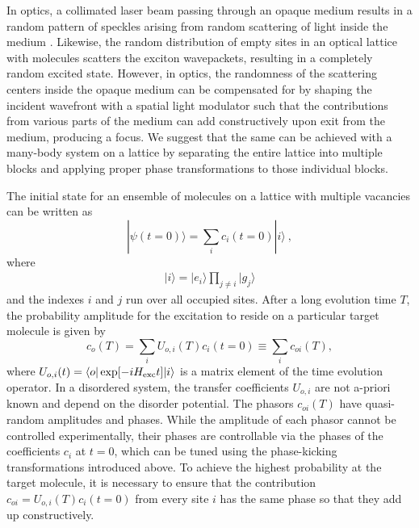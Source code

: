 In optics, a collimated laser beam passing through an opaque medium results in a random
pattern of speckles arising from random scattering of light inside the medium
\cite{RandomWave-books}. Likewise, the random distribution of empty sites in an optical lattice with molecules 
scatters the exciton wavepackets, resulting in a completely random excited state. 
However, in optics, the randomness of the scattering centers inside the opaque medium can be compensated for by
shaping the incident wavefront with a spatial light modulator such
that the contributions from various parts of the medium can add
constructively upon exit from the medium, producing a focus. 
We suggest that the same can be achieved with a many-body system on a lattice by 
separating the entire lattice into multiple blocks and applying proper phase transformations
to those individual blocks. 



%

The initial state for an ensemble of molecules on a lattice with multiple vacancies can be written as 
\begin{equation}
|\psi(t=0)\rangle = \sum_{i}c_i(t=0)|i\rangle \ , \label{planewave-initial}
\end{equation}
where 
\begin{eqnarray}
| i \rangle = |e_i\rangle \prod_{j\neq i} |g_j\rangle
\end{eqnarray}
and the indexes $i$ and $j$ run over all occupied sites. After a long evolution time $T$, the probability amplitude for the excitation to reside on a particular target molecule is given by  
\begin{equation}
c_{o}(T) = \sum_{i} U_{o, i}(T)c_i(t=0) \equiv \sum_i c_{oi}(T), 
\label{site-contribution}
\end{equation}
where $U_{o,i}(t) = \langle o| \exp[-iH_{\rm exc}t] | i \rangle$ is a matrix element of the time evolution operator.
%
{In a disordered system, the transfer coefficients $U_{o, i}$
are not a-priori known and depend on the
disorder potential. The {phasors} $c_{oi}(T)$ have quasi-random
amplitudes and phases. While the amplitude of each phasor cannot be controlled experimentally, 
their phases are controllable via the phases of the coefficients $c_i$ at $t=0$, which can be tuned using the phase-kicking
transformations introduced above.} To achieve the highest probability
at the target molecule, it is necessary to ensure that the contribution
$c_{oi}=U_{o, i}(T)c_i(t=0)$ from every site $i$ has the same
phase so that they add up constructively.

